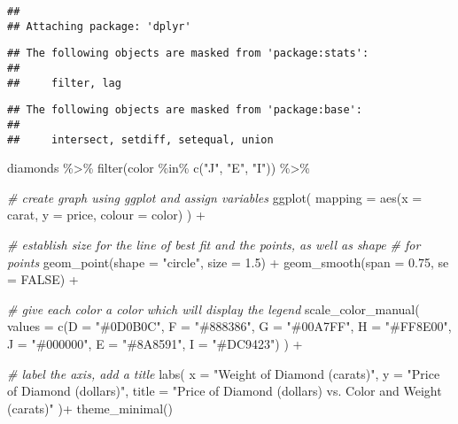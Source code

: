 \documentclass[
]{article}
\newenvironment{Shaded}{\begin{snugshade}}{\end{snugshade}}
\newcommand{\AttributeTok}[1]{\textcolor[rgb]{0.77,0.63,0.00}{#1}}
\newcommand{\CommentTok}[1]{\textcolor[rgb]{0.56,0.35,0.01}{\textit{#1}}}
\newcommand{\ConstantTok}[1]{\textcolor[rgb]{0.00,0.00,0.00}{#1}}
\newcommand{\FloatTok}[1]{\textcolor[rgb]{0.00,0.00,0.81}{#1}}
\newcommand{\FunctionTok}[1]{\textcolor[rgb]{0.00,0.00,0.00}{#1}}
\newcommand{\NormalTok}[1]{#1}
\newcommand{\SpecialCharTok}[1]{\textcolor[rgb]{0.00,0.00,0.00}{#1}}
\newcommand{\StringTok}[1]{\textcolor[rgb]{0.31,0.60,0.02}{#1}}
\begin{document}
\begin{verbatim}
## 
## Attaching package: 'dplyr'
\end{verbatim}

\begin{verbatim}
## The following objects are masked from 'package:stats':
## 
##     filter, lag
\end{verbatim}

\begin{verbatim}
## The following objects are masked from 'package:base':
## 
##     intersect, setdiff, setequal, union
\end{verbatim}

\begin{Shaded}
\begin{Highlighting}[]
\NormalTok{diamonds }\SpecialCharTok{\%\textgreater{}\%}
\FunctionTok{filter}\NormalTok{(color }\SpecialCharTok{\%in\%} \FunctionTok{c}\NormalTok{(}\StringTok{"J"}\NormalTok{, }\StringTok{"E"}\NormalTok{, }\StringTok{"I"}\NormalTok{)) }\SpecialCharTok{\%\textgreater{}\%}

\CommentTok{\# create graph using ggplot and assign variables}
\FunctionTok{ggplot}\NormalTok{(}
\AttributeTok{mapping =} \FunctionTok{aes}\NormalTok{(}\AttributeTok{x =}\NormalTok{ carat, }\AttributeTok{y =}\NormalTok{ price, }\AttributeTok{colour =}\NormalTok{ color)}
\NormalTok{) }\SpecialCharTok{+}

\CommentTok{\# establish size for the line of best fit and the points, as well as shape}
\CommentTok{\# for points}
\FunctionTok{geom\_point}\NormalTok{(}\AttributeTok{shape =} \StringTok{"circle"}\NormalTok{, }\AttributeTok{size =} \FloatTok{1.5}\NormalTok{) }\SpecialCharTok{+}
\FunctionTok{geom\_smooth}\NormalTok{(}\AttributeTok{span =} \FloatTok{0.75}\NormalTok{, }\AttributeTok{se =} \ConstantTok{FALSE}\NormalTok{) }\SpecialCharTok{+}

\CommentTok{\# give each color a color which will display the legend}
\FunctionTok{scale\_color\_manual}\NormalTok{(}
\AttributeTok{values =} \FunctionTok{c}\NormalTok{(}\AttributeTok{D =} \StringTok{"\#0D0B0C"}\NormalTok{,}
\AttributeTok{F =} \StringTok{"\#888386"}\NormalTok{,}
\AttributeTok{G =} \StringTok{"\#00A7FF"}\NormalTok{,}
\AttributeTok{H =} \StringTok{"\#FF8E00"}\NormalTok{,}
\AttributeTok{J =} \StringTok{"\#000000"}\NormalTok{,}
\AttributeTok{E =} \StringTok{"\#8A8591"}\NormalTok{,}
\AttributeTok{I =} \StringTok{"\#DC9423"}\NormalTok{)}
\NormalTok{) }\SpecialCharTok{+}

\CommentTok{\# label the axis, add a title}
\FunctionTok{labs}\NormalTok{(}
\AttributeTok{x =} \StringTok{"Weight of Diamond (carats)"}\NormalTok{,}
\AttributeTok{y =} \StringTok{"Price of Diamond (dollars)"}\NormalTok{,}
\AttributeTok{title =} \StringTok{"Price of Diamond (dollars) vs. Color and Weight (carats)"}
\NormalTok{)}\SpecialCharTok{+}
\FunctionTok{theme\_minimal}\NormalTok{()}
\end{Highlighting}
\end{Shaded}
\end{document}
